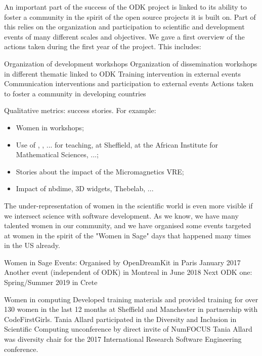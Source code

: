 \begin{Aim 1}
\begin{Aim 2}
\begin{itemize}
An important part of the success of the ODK project is linked to its ability to foster a community in the spirit of the open source projects it is built on. Part of this relies on the organization and participation to scientific and development events of many different scales and objectives. We gave a first overview of the actions taken during the first year of the project. This includes:

    Organization of development workshops
    Organization of dissemination workshops in different thematic linked to ODK
    Training intervention in external events
    Communication interventions and participation to external events
    Actions taken to foster a community in developing countries


Qualitative metrics: success stories. For example:
\begin{itemize}
\item Women in \Sage workshops;
\item Use of \Jupyter, \cocalc, ... for teaching, at Sheffield, at the
  African Institute for Mathematical Sciences, ...;
\item Stories about the impact of the Micromagnetics VRE;
\item Impact of nbdime, 3D widgets, Thebelab, ...
\end{itemize}

   
 The under-representation of women in the scientific world is even more visible if we intersect science with software
  development. As we know, we have many talented women in our community, and we have organised some events targeted at women in the
  spirit of the "Women in Sage" days that happened many times in the US already. %

Women in Sage Events:
    Organised by OpenDreamKit in Paris January 2017
    Another event (independent of ODK) in Montreal in June 2018
    Next ODK one: Spring/Summer 2019 in Crete

Women in computing
    Developed training materials and provided training for over 130 women in the last 12 months at Sheffield and Manchester in partnership 
    with CodeFirstGirls.
    Tania Allard participated in the Diversity and Inclusion in Scientific Computing unconference by direct invite of NumFOCUS
    Tania Allard was diversity chair for the 2017 International Research Software Engineering conference.


\end{itemize}
\end{Aim 2}
\end{Aim 1}
